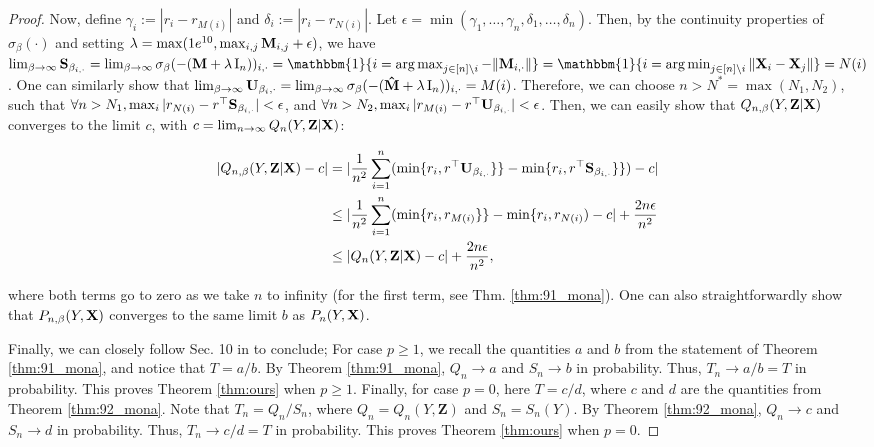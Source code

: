 \begin{proof}
Now, define $\gamma_i := |r_i-r_{M(i)}|$ and $\delta_i := |r_i-r_{N(i)}|$. Let $\epsilon = \min (\gamma_1, \dots, \gamma_n, \delta_1, \dots, \delta_n)$. Then, by the continuity properties of $\sigma_\beta(\cdot)$ and setting $\lambda=\max(1e^{10}, \max_{i,j}{\bf{M}}_{i,j}+\epsilon)$, we have $\lim_{\beta\rightarrow\infty} {\bf{S}}_{{\beta}_{i,\cdot}}= \lim_{\beta\rightarrow\infty} \sigma_\beta(-({\bf{M}}+\lambda\Idn))_{{i,\cdot}} = \mathbbm{1}\{ i=\argmax_{j\in[n]\setminus i} - \|{\bf{M}}_{i, \cdot}\|\} = \mathbbm{1}\{i=\argmin_{j\in[n]\setminus i} \|\bfX_i-\bfX_j\|\}=N(i)$. One can similarly show that $\lim_{\beta\rightarrow\infty}{{\bf{U}}_{\beta_i,\cdot}} = \lim_{\beta\rightarrow\infty} \sigma_\beta(-({\bf{\hat{M}}}+\lambda\operatorname{I}_n))_{{i,\cdot}} = M(i)$. Therefore, we can choose $n>N^*=\max(N_1, N_2)$, such that $\forall n>N_1, \max_i |r_{N(i)}-r^\top {\bf{S}}_{{\beta}_{i,\cdot}}|<\epsilon$, and $\forall n>N_2, \max_i |r_{M(i)}-r^\top {\bf{U}}_{{\beta}_{i,\cdot}}|<\epsilon$. Then, we can easily show that $Q_{n,\beta}(Y, \mathbf{Z} |\mathbf{X})$ converges to the limit $c$, with $c=\lim_{n\rightarrow\infty}Q_n(Y, \mathbf{Z} |\mathbf{X})$:

    \begin{align*}
        |Q_{n,\beta}(Y, \mathbf{Z} |\mathbf{X})-c| & = |\frac{1}{n^2} \sum_{i=1}^n (\min\{r_i, r^\top{\bf{U}}_{{\beta}_{i, \cdot}}\}\} - \min\{r_i, r^\top{\bf{S}}_{{\beta}_{i, \cdot}}\}\})-c|  \\
        & \leq |\frac{1}{n^2} \sum_{i=1}^n (\min\{r_i, r_{M(i)}\}\} - \min\{r_i, r_{N(i)})-c| + \frac{2n\epsilon}{n^2} \\
        & \leq |Q_{n}(Y, \mathbf{Z} |\mathbf{X})-c| + \frac{2n\epsilon}{n^2},
    \end{align*}
    
    where both terms go to zero as we take $n$ to infinity (for the first term, see Thm. \ref{thm:91_mona}). One can also straightforwardly show that $P_{n,\beta}(Y, \mathbf{X})$ converges to the same limit $b$ as $P_n(Y, \mathbf{X})$. 
    
    Finally, we can closely follow Sec. 10 in \citet{azadkia2021simple} to conclude; For case $p\geq1$, we recall the quantities $a$ and $b$ from the statement of Theorem \ref{thm:91_mona}, and notice that $T=a / b$.  By Theorem \ref{thm:91_mona}, $Q_n \rightarrow a$ and $S_n \rightarrow b$ in probability. Thus, $T_n \rightarrow a / b=T$ in probability. This proves Theorem \ref{thm:ours} when $p \geq 1$. Finally, for case $p=0$, here $T=c / d$, where $c$ and $d$ are the quantities from Theorem \ref{thm:92_mona}.  Note that $T_n=Q_n / S_n$, where $Q_n=Q_n(Y, \mathbf{Z})$ and $S_n=S_n(Y)$. By Theorem \ref{thm:92_mona}, $Q_n \rightarrow c$ and $S_n \rightarrow d$ in probability. Thus, $T_n \rightarrow c / d=T$ in probability. This proves Theorem \ref{thm:ours} when $p=0$.

\end{proof}


